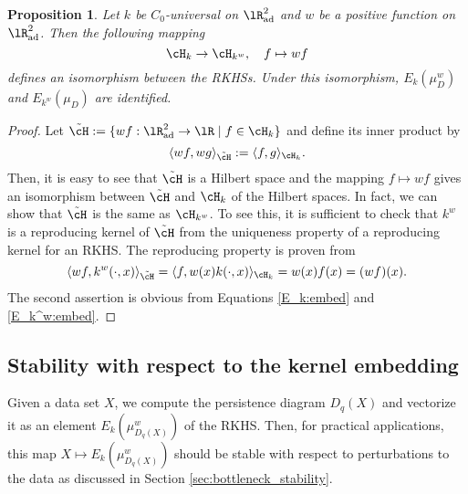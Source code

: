 \documentclass{article}
\newtheorem{prop}[thm]{Proposition}
\begin{document}
\begin{prop}\label{prop:iso}
Let $k$ be $C_{0}$-universal on $\lR^{2}_{{\rm ad}}$ and $w$ be a positive function on $\lR^{2}_{{\rm ad}}$.
Then the following mapping
\[
\cH_k\to \cH_{k^w}, \quad f\mapsto wf
\]
defines an isomorphism between the RKHSs.  Under this isomorphism, $E_k(\mu_D^w)$ and $E_{k^w}(\mu_D)$ are identified. 
\end{prop}

\begin{proof}
Let $\tilde{\cH}:=\{wf:\lR^{2}_{{\rm ad}}\to\lR\mid f\in \cH_k\}$ and define its inner product by
\[
\langle wf,wg\rangle_{\tilde{\cH}}:=\langle f, g\rangle_{\cH_k}.
\]
Then, it is easy to see that $\tilde{\cH}$ is a Hilbert space and the mapping $f\mapsto wf$ gives an isomorphism between $\tilde{\cH}$ and $\cH_{k}$ of the Hilbert spaces.
In fact, we can show that $\tilde{\cH}$ is the same as $\cH_{k^w}$.
To see this, it is sufficient to check that $k^w$ is a reproducing kernel of $\tilde{\cH}$ from the uniqueness property of a reproducing kernel for an RKHS.
The reproducing property is proven from 
\[
\langle wf, k^w(\cdot,x)\rangle_{\tilde{\cH}}=\langle f,w(x)k(\cdot,x)\rangle_{\cH_k} = w(x)f(x) = (wf)(x).
\]
The second assertion is obvious from Equations \eqref{E_k:embed} and \eqref{E_k^w:embed}.
\end{proof}

 

\subsection{Stability with respect to the kernel embedding}
\label{subsec:stability}

Given a data set $X$, we compute the persistence diagram $D_{q}(X)$ and vectorize it as an element $E_{k}(\mu_{D_{q}(X)}^{w})$ of the RKHS.
Then, for practical applications, this map $X \mapsto E_{k}(\mu_{D_{q}(X)}^{w})$ should be stable with respect to perturbations to the data as discussed in Section \ref{sec:bottleneck_stability}. 
\end{document}
